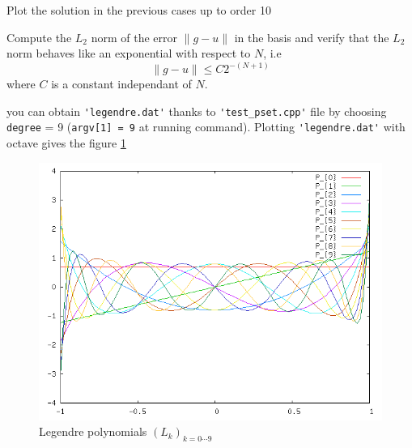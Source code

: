 \documentclass{article}
\begin{document}
\begin{Exercise}[title={p type Galerkin method in 1D}]
  \Question Plot the solution in the previous cases up to order 10

  \Question Compute the $L_2$ norm of the error $\|g-u\|$ in the basis
  and verify that the $L_2$ norm behaves like an exponential with respect to $N$, i.e
  \begin{equation}
    \label{eq:13}
    \|g-u\| \leq C 2^{-(N+1)}
  \end{equation}
  where $C$ is a constant independant of $N$.
\end{Exercise}

\begin{Answer}
  \Question you can obtain \verb+'legendre.dat'+ thanks to
  \verb+'test_pset.cpp'+ file by choosing \verb+degree+ = 9
  (\verb+argv[1] = 9+ at running command).
Plotting \verb+'legendre.dat'+ with octave gives the figure \ref{fig:1}
\begin{figure}[H]
  \label{fig:1}
  \centering
  \includegraphics[scale=0.4]{legendre.png}
  \caption{Legendre polynomials $(L_k)_{k=0 \cdots 9}$}
\end{figure}

\end{Answer}
\end{document}
